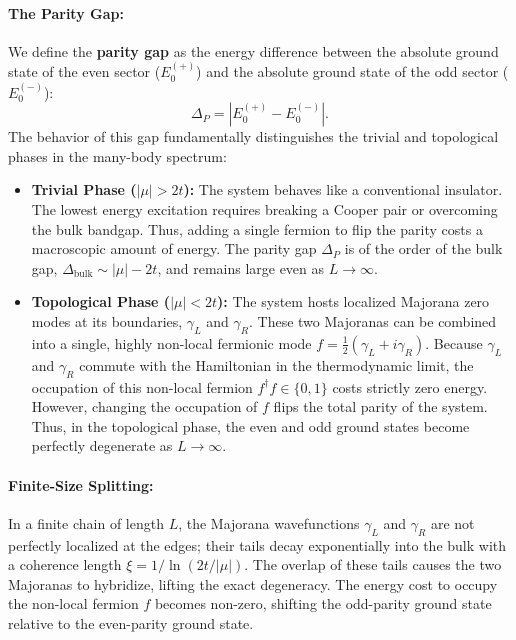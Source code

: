 \documentclass[11pt]{article}
\begin{document}
\paragraph{The Parity Gap:}
We define the \textbf{parity gap} as the energy difference between the absolute ground state of the even sector ($E_0^{(+)}$) and the absolute ground state of the odd sector ($E_0^{(-)}$):
\begin{equation}
  \Delta_P = |E_0^{(+)} - E_0^{(-)}|.
\end{equation}
The behavior of this gap fundamentally distinguishes the trivial and topological phases in the many-body spectrum:

\begin{itemize}
  \item \textbf{Trivial Phase ($|\mu| > 2t$):} The system behaves like a conventional insulator. The lowest energy excitation requires breaking a Cooper pair or overcoming the bulk bandgap. Thus, adding a single fermion to flip the parity costs a macroscopic amount of energy. The parity gap $\Delta_P$ is of the order of the bulk gap, $\Delta_{\text{bulk}} \sim |\mu| - 2t$, and remains large even as $L \to \infty$.
  
  \item \textbf{Topological Phase ($|\mu| < 2t$):} The system hosts localized Majorana zero modes at its boundaries, $\gamma_L$ and $\gamma_R$. These two Majoranas can be combined into a single, highly non-local fermionic mode $f = \frac{1}{2}(\gamma_L + i\gamma_R)$. Because $\gamma_L$ and $\gamma_R$ commute with the Hamiltonian in the thermodynamic limit, the occupation of this non-local fermion $f^\dagger f \in \{0, 1\}$ costs strictly zero energy. However, changing the occupation of $f$ flips the total parity of the system. Thus, in the topological phase, the even and odd ground states become perfectly degenerate as $L \to \infty$.
\end{itemize}

\paragraph{Finite-Size Splitting:}
In a finite chain of length $L$, the Majorana wavefunctions $\gamma_L$ and $\gamma_R$ are not perfectly localized at the edges; their tails decay exponentially into the bulk with a coherence length $\xi = 1/\ln(2t/|\mu|)$. The overlap of these tails causes the two Majoranas to hybridize, lifting the exact degeneracy. The energy cost to occupy the non-local fermion $f$ becomes non-zero, shifting the odd-parity ground state relative to the even-parity ground state. 
\end{document}
